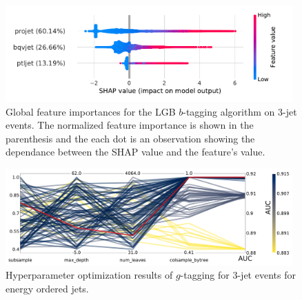 \begin{figure}[h!]
  \includegraphics[width=0.98\textwidth, trim=10 10 20 10, clip]{figures/quarks/shap_global-down_sample=1.00-ML_vars=vertex-selection=b-ejet_min=4-n_iter_RS_lgb=99-n_iter_RS_xgb=9-cdot_cut=0.90-version=19-njet=3.pdf}
  \caption[Global Feature Importances for the LGB $b$-Tagging Algorithm on 3-Jet Events]
          {Global feature importances for the LGB $b$-tagging algorithm on 3-jet events. The normalized feature importance is shown in the parenthesis and the each dot is an observation showing the dependance between the SHAP value and the feature's value. 
          } 
  \label{fig:q:shap_btag_global_3j}
\end{figure}

\newpage
\FloatBarrier


\begin{figure}[h!]
  \includegraphics[width=0.98\textwidth, trim=0 0 0 0, clip]{figures/quarks/CV_viz-njet=3-name=lf_gtag_energy_ordered_lgb_down_sample=1.00-ML_vars=vertex-selection=b-ejet_min=4-n_iter_RS_lgb=99-n_iter_RS_xgb=9-cdot_cut=0.90-version=19.pdf}
  \caption[Parallel Plot of HPO Results for 3-Jet $g$-Tagging for Energy Ordered Jets]
          {Hyperparameter optimization results of $g$-tagging for 3-jet events for energy ordered jets. 
          } 
  \label{fig:q:CV_res_parallel_coords_g_tag_3j_energy_ordered}
\end{figure}



